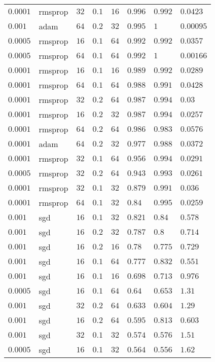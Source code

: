 \begin{table}[tbp]
\begin{tabular}{llllllll}
$0.0001$ & rmsprop & $32$ & $0.1$ & $16$ & $0.996$ & $0.992$ & $0.0423$ \\
$0.001$ & adam & $64$ & $0.2$ & $32$ & $0.995$ & $1$ & $0.00095$ \\
$0.0005$ & rmsprop & $16$ & $0.1$ & $64$ & $0.992$ & $0.992$ & $0.0357$ \\
$0.0005$ & rmsprop & $64$ & $0.1$ & $64$ & $0.992$ & $1$ & $0.00166$ \\
$0.0001$ & rmsprop & $16$ & $0.1$ & $16$ & $0.989$ & $0.992$ & $0.0289$ \\
$0.0001$ & rmsprop & $64$ & $0.1$ & $64$ & $0.988$ & $0.991$ & $0.0428$ \\
$0.0001$ & rmsprop & $32$ & $0.2$ & $64$ & $0.987$ & $0.994$ & $0.03$ \\
$0.0001$ & rmsprop & $16$ & $0.2$ & $32$ & $0.987$ & $0.994$ & $0.0257$ \\
$0.0001$ & rmsprop & $64$ & $0.2$ & $64$ & $0.986$ & $0.983$ & $0.0576$ \\
$0.0001$ & adam & $64$ & $0.2$ & $32$ & $0.977$ & $0.988$ & $0.0372$ \\
$0.0001$ & rmsprop & $32$ & $0.1$ & $64$ & $0.956$ & $0.994$ & $0.0291$ \\
$0.0005$ & rmsprop & $32$ & $0.2$ & $64$ & $0.943$ & $0.993$ & $0.0261$ \\
$0.0001$ & rmsprop & $32$ & $0.1$ & $32$ & $0.879$ & $0.991$ & $0.036$ \\
$0.0001$ & rmsprop & $64$ & $0.1$ & $32$ & $0.84$ & $0.995$ & $0.0259$ \\
$0.001$ & sgd & $16$ & $0.1$ & $32$ & $0.821$ & $0.84$ & $0.578$ \\
$0.001$ & sgd & $16$ & $0.2$ & $32$ & $0.787$ & $0.8$ & $0.714$ \\
$0.001$ & sgd & $16$ & $0.2$ & $16$ & $0.78$ & $0.775$ & $0.729$ \\
$0.001$ & sgd & $16$ & $0.1$ & $64$ & $0.777$ & $0.832$ & $0.551$ \\
$0.001$ & sgd & $16$ & $0.1$ & $16$ & $0.698$ & $0.713$ & $0.976$ \\
$0.0005$ & sgd & $16$ & $0.1$ & $64$ & $0.64$ & $0.653$ & $1.31$ \\
$0.001$ & sgd & $32$ & $0.2$ & $64$ & $0.633$ & $0.604$ & $1.29$ \\
$0.001$ & sgd & $16$ & $0.2$ & $64$ & $0.595$ & $0.813$ & $0.603$ \\
$0.001$ & sgd & $32$ & $0.1$ & $32$ & $0.574$ & $0.576$ & $1.51$ \\
$0.0005$ & sgd & $16$ & $0.1$ & $32$ & $0.564$ & $0.556$ & $1.62$ \\

\end{tabular}
\end{table}
